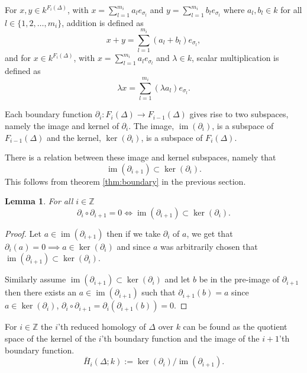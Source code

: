 \documentclass[11pt,a4paper,twoside]{report}
\newtheorem{mylem}[mythm]{Lemma}
\DeclareMathOperator{\im}{im}
\begin{document}
For $x,y\in k^{F_i(\Delta)}$, with $x = \sum_{l=1}^{m_i}a_le_{\sigma_l}$ and $y = \sum_{l=1}^{m_i}b_le_{\sigma_l}$ where $a_l,b_l\in k$ for all $l\in\{1,2,\dots,m_i\}$, addition is defined as 
\begin{equation*}
x+y = \sum_{l=1}^{m_i}(a_l+b_l)e_{\sigma_l},
\end{equation*}
and for $x\in k^{F_i(\Delta)}$, with $x = \sum_{l=1}^{m_i}a_le_{\sigma_l}$ and $\lambda \in k$, scalar multiplication is defined as 
\begin{equation*}
\lambda x = \sum_{l=1}^{m_i}(\lambda a_l)e_{\sigma_l}.
\end{equation*}

Each boundary function $\partial_i:F_i(\Delta)\to F_{i-1}(\Delta)$ gives rise to two subspaces, namely the image and kernel of $\partial_i$. The image, $\im(\partial_i)$, is a subspace of $F_{i-1}(\Delta)$ and the kernel, $\ker(\partial_i)$, is a subspace of $F_{i}(\Delta)$. 

There is a relation between these image and kernel subspaces, namely that 
\begin{equation*}
\im(\partial_{i+1})\subset\ker(\partial_i).
\end{equation*}
This follows from theorem \ref{thm:boundary} in the previous section.
\begin{mylem}\label{lem:subset}
For all $i\in\mathbb{Z}$ 
\begin{equation*}
\partial_i\circ\partial_{i+1}=0 \Leftrightarrow \im(\partial_{i+1})\subset\ker(\partial_i).
\end{equation*}
\end{mylem}
\begin{proof}
Let $a\in \im(\partial_{i+1})$ then if we take $\partial_i$ of $a$, we get that $\partial_i(a)=0\implies a\in \ker(\partial_i)$ and since $a$ was arbitrarily chosen that $\im(\partial_{i+1})\subset \ker(\partial_i)$. 

Similarly assume $\im(\partial_{i+1})\subset \ker(\partial_i)$ and let $b$ be in the pre-image of $\partial_{i+1}$ then there exists an $a\in\im(\partial_{i+1})$ such that 
$\partial_{i+1}(b)=a$ since $a\in\ker(\partial_i)$, $\partial_i\circ\partial_{i+1}=\partial_i(\partial_{i+1}(b))=0$. 
\end{proof}


For $i\in\mathbb{Z}$ the $i$'th reduced homology of $\Delta$ over $k$ can be found as the quotient space of the kernel of the $i$'th boundary function and the image of the $i+1$'th boundary function. \cite[p.2]{Allgaier}
\begin{equation}
\bar{H}_i(\Delta;k):=\ker(\partial_i)/\im(\partial_{i+1}).
\end{equation}
\end{document}
